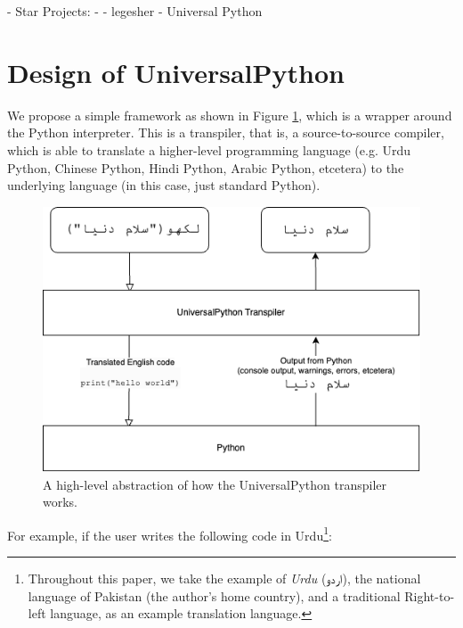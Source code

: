 \documentclass[conference]{IEEEtran}
\begin{document}
- Star Projects:
  - 
  - legesher \cite{legesher}
  - Universal Python \cite{otten2023towards}


\section{Design of UniversalPython}

We propose a simple framework as shown in Figure \ref{flowchart}, which is a wrapper around the Python interpreter. This is a transpiler, that is, a source-to-source compiler, which is able to translate a higher-level programming language (e.g. Urdu Python, Chinese Python, Hindi Python, Arabic Python, etcetera) to the underlying language (in this case, just standard Python).

\begin{figure}[htbp]
\centerline{\includegraphics[width=\columnwidth]{UniversalPython-flowchart.png}}
\caption{A high-level abstraction of how the UniversalPython transpiler works.}
\label{flowchart}
\end{figure}

For example, if the user writes the following code in Urdu\footnote{Throughout this paper, we take the example of \textit{Urdu} (\texturdu{اردو}), the national language of Pakistan (the author's home country), and a traditional Right-to-left language, as an example translation language. }:
\end{document}
